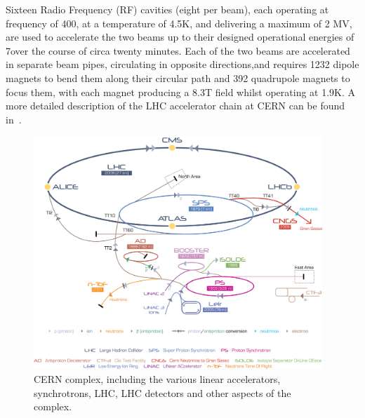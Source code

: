 Sixteen Radio Frequency (RF) cavities (eight per beam), each operating at frequency of 400\MHz, at a temperature of 4.5K, and delivering a maximum of 2 MV, are used to accelerate the two beams up to their designed operational energies of 7\TeV over the course of circa twenty minutes.
Each of the two beams are accelerated in separate beam pipes, circulating in opposite directions,and requires 1232 dipole magnets to bend them along their circular path and 392 quadrupole magnets to focus them, with each magnet producing a 8.3T field whilst operating at 1.9K.
A more detailed description of the LHC accelerator chain at CERN can be found in~\cite{Schindl:397574}. 

\begin{figure}[htbp]
\begin{center}
\includegraphics[width=0.97\textwidth]{figs/lhc/Cern-Accelerator-Complex.jpg}
\caption{CERN complex, including the various linear accelerators, synchrotrons, LHC, LHC detectors and other aspects of the complex.}
\label{fig:cern-accelerator-complex}
\end{center}
\end{figure}

